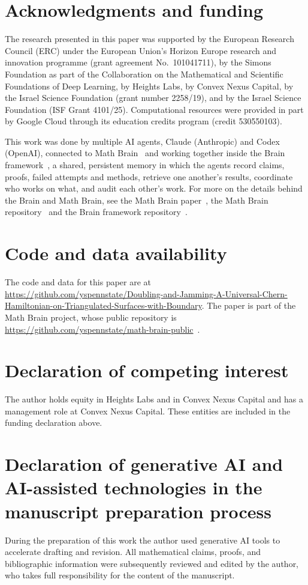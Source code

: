 \documentclass[11pt]{article}
\numberwithin{equation}{section}
\theoremstyle{definition}
\theoremstyle{remark}
\begin{document}
\section*{Acknowledgments and funding}
The research presented in this paper was supported by the European Research Council (ERC) under the European Union's Horizon Europe research and innovation programme (grant agreement No.~101041711), by the Simons Foundation as part of the Collaboration on the Mathematical and Scientific Foundations of Deep Learning, by Heights Labs, by Convex Nexus Capital, by the Israel Science Foundation (grant number 2258/19), and by the Israel Science Foundation (ISF Grant 4101/25). Computational resources were provided in part by Google Cloud through its education credits program (credit 530550103).

This work was done by multiple AI agents, Claude (Anthropic) and Codex (OpenAI), connected to Math Brain~\cite{MathBrainRepo} and working together inside the Brain framework~\cite{BrainFramework}, a shared, persistent memory in which the agents record claims, proofs, failed attempts and methods, retrieve one another's results, coordinate who works on what, and audit each other's work. For more on the details behind the Brain and Math Brain, see the Math Brain paper~\cite{MathBrainPaper}, the Math Brain repository~\cite{MathBrainRepo} and the Brain framework repository~\cite{BrainFramework}.

\section*{Code and data availability}
The code and data for this paper are at \url{https://github.com/yspennstate/Doubling-and-Jamming-A-Universal-Chern-Hamiltonian-on-Triangulated-Surfaces-with-Boundary}. The paper is part of the Math Brain project, whose public repository is \url{https://github.com/yspennstate/math-brain-public}~\cite{MathBrainRepo}.

\section*{Declaration of competing interest}
The author holds equity in Heights Labs and in Convex Nexus Capital and has a management role at Convex Nexus Capital. These entities are included in the funding declaration above.

\section*{Declaration of generative AI and AI-assisted technologies in the manuscript preparation process}
During the preparation of this work the author used generative AI tools to accelerate drafting
and revision. All mathematical claims, proofs, and bibliographic information were subsequently
reviewed and edited by the author, who takes full responsibility for the content of the manuscript.
\end{document}
